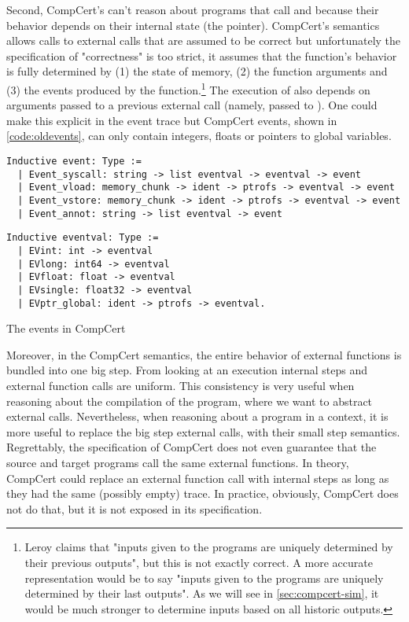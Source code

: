 Second, CompCert's can't reason about programs that call  and  because their behavior depends on their internal state (the  pointer). CompCert's semantics allows calls to external calls that are assumed to be correct but unfortunately the specification of "correctness" is too strict, it assumes that the function's behavior is fully determined by (1) the state of memory, (2) the function arguments and (3) the events produced by the function.\footnote{Leroy \cite{Leroy-Compcert-CACM} claims that "inputs given to the programs are uniquely determined by their previous outputs", but this is not exactly correct. A more accurate representation would be to say "inputs given to the programs are uniquely determined by their last outputs". As we will see in \ref{sec:compcert-sim}, it would be much stronger to determine inputs based on all historic outputs.} The execution of  also depends on arguments passed to a previous external call (namely,  passed to ). One could make this explicit in the event trace but CompCert events, shown in \ref{code:oldevents}, can only contain integers, floats or pointers to global variables.
 
\begin{table}\centering
\begin{multicols}{2}
\begin{lstlisting}[style=CoqTheorem-list]
Inductive event: Type :=
  | Event_syscall: string -> list eventval -> eventval -> event
  | Event_vload: memory_chunk -> ident -> ptrofs -> eventval -> event
  | Event_vstore: memory_chunk -> ident -> ptrofs -> eventval -> event
  | Event_annot: string -> list eventval -> event
  \end{lstlisting}
  
  \begin{lstlisting}
Inductive eventval: Type :=
  | EVint: int -> eventval
  | EVlong: int64 -> eventval
  | EVfloat: float -> eventval
  | EVsingle: float32 -> eventval
  | EVptr_global: ident -> ptrofs -> eventval.
  \end{lstlisting}
\end{multicols}
\caption{The events in CompCert}\label{code:oldevents}
\end{table}

Moreover, in the CompCert semantics, the entire behavior of external functions is bundled into one big step. From looking at an execution internal steps and external function calls are uniform. This consistency is very useful when reasoning about the compilation of the program, where we want to abstract external calls. Nevertheless, when reasoning about a program in a context, it is more useful to replace the big step external calls, with their small step semantics. Regrettably, the specification of CompCert does not even guarantee that the source and target programs call the same external functions. In theory, CompCert could replace an external function call with internal steps as long as they had the same (possibly empty) trace. In practice, obviously, CompCert does not do that, but it is not exposed in its specification.

